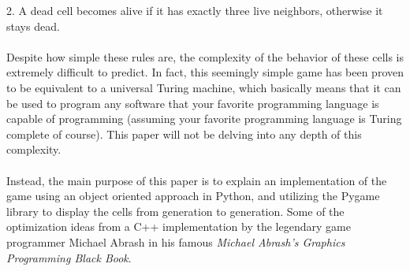 \documentclass[12pt]{report}
\begin{document}
2. A dead cell becomes alive if it has exactly three live neighbors, otherwise it stays dead.\\\\
Despite how simple these rules are, the complexity of the behavior of these cells is extremely difficult to predict.
In fact, this seemingly simple game has been proven to be equivalent to a universal Turing machine, which basically
means that it can be used to program any software that your favorite programming language is capable of programming 
(assuming your favorite programming language is Turing complete of course).\cite{rendell:2011}
This paper will not be delving into any depth of this complexity.\\\\
Instead, the main purpose of this paper is to explain an implementation of the game using an object oriented approach in Python,
and utilizing the Pygame library to display the cells from generation to generation. Some of the optimization ideas from
a C++ implementation by the legendary game programmer Michael Abrash in his famous \emph{Michael Abrash's Graphics Programming Black Book}.\cite{abrash:1997}
\end{document}
